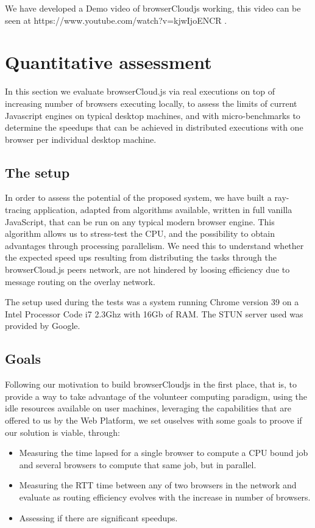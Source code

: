 We have developed a Demo video of browserCloudjs working, this video can be seen at https://www.youtube.com/watch?v=kjwIjoENCR .

\section{Quantitative assessment}

In this section we evaluate browserCloud.js via real executions on top of increasing number of browsers executing locally, to assess the limits of current Javascript engines on typical desktop machines, and with micro-benchmarks to determine the speedups that can be achieved in distributed executions with one browser per individual desktop machine.

\subsection{The setup}

In order to assess the potential of the proposed system, we have built a ray-tracing application, adapted from algorithms available, written in full vanilla JavaScript, that can be run on any typical modern browser engine. This algorithm allows us to stress-test the CPU,  and the possibility to obtain advantages through processing parallelism. We need this to understand whether the expected speed ups resulting from distributing the tasks through the browserCloud.js peers network, are not hindered by loosing efficiency due to message routing on the overlay network.

The setup used during the tests was a system running Chrome version 39 on a Intel Processor Code i7 2.3Ghz with 16Gb of RAM. The STUN server used was provided by Google.

\subsection{Goals}

Following our motivation to build browserCloudjs in the first place, that is, to provide a way to take advantage of the volunteer computing paradigm, using the idle resources available on user machines, leveraging the capabilities that are offered to us by the Web Platform, we set ouselves with some goals to proove if our solution is viable, through:

\begin{itemize}
    \item Measuring the time lapsed for a single browser to compute a CPU bound job and several browsers to compute that same job, but in parallel.
    \item Measuring the RTT time between any of two browsers in the network and evaluate as routing efficiency evolves with the increase in number of browsers.
    \item Assessing if there are significant speedups.
\end{itemize}

